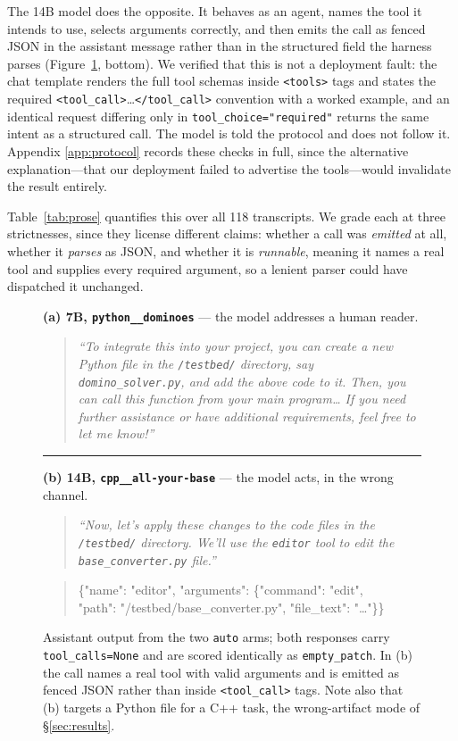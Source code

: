 \documentclass{article}
\begin{document}
The 14B model does the opposite. It behaves as an agent, names the tool it
intends to use, selects arguments correctly, and then emits the call as fenced
JSON in the assistant message rather than in the structured field the harness
parses (Figure~\ref{fig:transcripts}, bottom). We verified that this is not a
deployment fault: the chat template renders the full tool schemas inside
\texttt{<tools>} tags and states the required
\texttt{<tool\_call>}\ldots\texttt{</tool\_call>} convention with a worked
example, and an identical request differing only in
\texttt{tool\_choice="required"} returns the same intent as a structured call.
The model is told the protocol and does not follow it. Appendix
\ref{app:protocol} records these checks in full, since the alternative
explanation---that our deployment failed to advertise the tools---would
invalidate the result entirely.

Table~\ref{tab:prose} quantifies this over all 118 transcripts. We grade
each at three strictnesses, since they license different claims: whether a
call was \emph{emitted} at all, whether it \emph{parses} as JSON, and whether
it is \emph{runnable}, meaning it names a real tool and supplies every
required argument, so a lenient parser could have dispatched it unchanged.

\begin{figure}[t]
\centering
\small
\begin{minipage}{0.95\linewidth}
\textbf{(a) 7B, \texttt{python\_\_dominoes}} --- the model addresses a human
reader.
\begin{quote}\itshape\footnotesize
``To integrate this into your project, you can create a new Python file in the
\texttt{/testbed/} directory, say \texttt{domino\_solver.py}, and add the above
code to it. Then, you can call this function from your main
program\ldots{} If you need further assistance or have additional
requirements, feel free to let me know!''
\end{quote}
\rule{\linewidth}{0.4pt}
\textbf{(b) 14B, \texttt{cpp\_\_all-your-base}} --- the model acts, in the
wrong channel.
\begin{quote}\itshape\footnotesize
``Now, let's apply these changes to the code files in the \texttt{/testbed/}
directory. We'll use the \texttt{editor} tool to edit the
\texttt{base\_converter.py} file.''
\end{quote}
\begin{quote}\ttfamily\footnotesize
\{"name": "editor", "arguments": \{"command": "edit",\\
"path": "/testbed/base\_converter.py", "file\_text": "\ldots"\}\}
\end{quote}
\end{minipage}
\caption{Assistant output from the two \texttt{auto} arms; both responses
carry \texttt{tool\_calls=None} and are scored identically as
\texttt{empty\_patch}. In (b) the call names a real tool with valid
arguments and is emitted as fenced JSON rather than inside
\texttt{<tool\_call>} tags. Note also that (b) targets a Python file for a
C++ task, the wrong-artifact mode of \S\ref{sec:results}.}
\label{fig:transcripts}
\end{figure}
\end{document}
